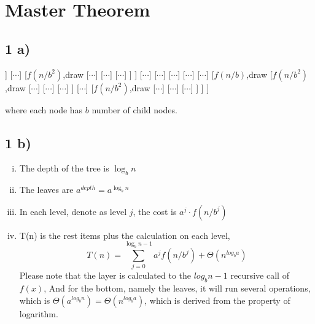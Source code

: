\documentclass[A4paper]{article}
\begin{document}
\section{Master Theorem}
\subsection*{1 a)}
\begin{center}
\begin{forest}
[$f(n)$,draw
	[$f(n/b)$,draw
		[$f(n/b^2)$,draw
			[$\cdots$]
			[$\cdots$]
			[$\cdots$]
		]
		[$\cdots$]
		[$f(n/b^2)$,draw
			[$\cdots$]
			[$\cdots$]
			[$\cdots$]
		]
	]
	[$\cdots$]
	[$\cdots$]
	[$\cdots$]
	[$\cdots$]
	[$\cdots$]
	[$f(n/b)$,draw
		[$f(n/b^2)$,draw
			[$\cdots$]
			[$\cdots$]
			[$\cdots$]
		]
		[$\cdots$]
		[$f(n/b^2)$,draw
			[$\cdots$]
			[$\cdots$]
			[$\cdots$]
		]
	]
]
\end{forest}
\end{center}
where each node has $b$ number of child nodes.
\subsection*{1 b)}
\begin{enumerate}[i)]
\item The depth of the tree is $\log_{b}n$
\item The leaves are $\displaystyle a^{depth} = a^{\log_{b}n}$
\item In each level, denote as level $j$, the cost is $a^j\cdot f(n/b^j)$
\item T(n) is the rest items plus the calculation on each level,
\[
	T(n) = \sum_{j=0}^{\log_b {n-1}} a^j f(n/b^j) + \Theta(n^{log_ba})
\]
Please note that the layer is calculated to the $log_b n-1$ recursive call of $f(x)$, And for the bottom, namely the leaves, it will run several operations, which is $\Theta(a^{log_bn}) = \Theta(n^{log_ba})$, which is derived from the property of logarithm.
\end{enumerate}
\end{document}
